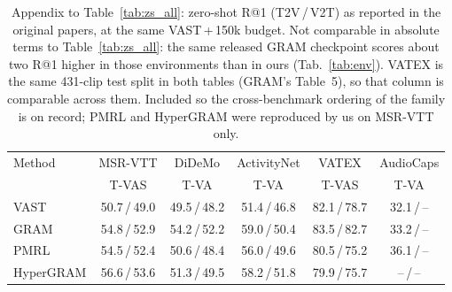 \begin{table}[t]
\centering
\caption{Appendix to Table~\ref{tab:zs_all}: zero-shot R@1 (T2V\,/\,V2T) as reported in the
original papers, at the same VAST\,+\,150k budget. Not comparable in absolute terms to
Table~\ref{tab:zs_all}: the same released GRAM checkpoint scores about two R@1 higher in
those environments than in ours (Tab.~\ref{tab:env}). VATEX is the same 431-clip test split in both
tables (GRAM's Table~5), so that column is comparable across them.
Included so the cross-benchmark ordering of the family is on record; PMRL and HyperGRAM
were reproduced by us on MSR-VTT only.}
\label{tab:zs_reported}
\small
\setlength{\tabcolsep}{6pt}
\begin{tabular}{lccccc}
\toprule
Method & MSR-VTT & DiDeMo & ActivityNet & VATEX & AudioCaps \\
 & T-VAS & T-VA & T-VA & T-VAS & T-VA \\
\midrule
VAST & 50.7\,/\,49.0 & 49.5\,/\,48.2 & 51.4\,/\,46.8 & 82.1\,/\,78.7 & 32.1\,/\,-- \\
GRAM & 54.8\,/\,52.9 & 54.2\,/\,52.2 & 59.0\,/\,50.4 & 83.5\,/\,82.7 & 33.2\,/\,-- \\
PMRL & 54.5\,/\,52.4 & 50.6\,/\,48.4 & 56.0\,/\,49.6 & 80.5\,/\,75.2 & 36.1\,/\,-- \\
HyperGRAM & 56.6\,/\,53.6 & 51.3\,/\,49.5 & 58.2\,/\,51.8 & 79.9\,/\,75.7 & --\,/\,-- \\
\bottomrule
\end{tabular}
\end{table}
